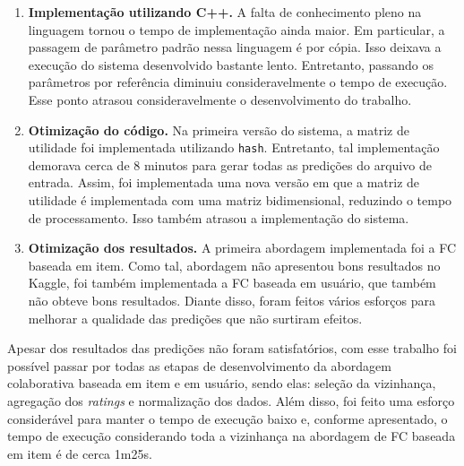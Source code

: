 \documentclass[brazil,a4paper,11pt]{article}
\begin{document}
\begin{enumerate}
 \item \textbf{Implementação utilizando C++.} A falta de conhecimento pleno na linguagem tornou o tempo de implementação ainda maior. Em particular, a passagem de parâmetro padrão nessa linguagem é por cópia. Isso deixava a execução do sistema desenvolvido bastante lento. Entretanto, passando os parâmetros por referência diminuiu consideravelmente o tempo de execução.  Esse ponto atrasou consideravelmente o desenvolvimento do trabalho.
 
 \item \textbf{Otimização do código.} Na primeira versão do sistema, a matriz de utilidade foi implementada utilizando \texttt{hash}. Entretanto, tal implementação demorava cerca de 8 minutos para gerar todas as predições do arquivo de entrada. Assim, foi implementada uma nova versão em que a matriz de utilidade é implementada com uma matriz bidimensional, reduzindo o tempo de processamento. Isso também atrasou a implementação do sistema.
 
 \item \textbf{Otimização dos resultados.} A primeira abordagem implementada foi a FC baseada em item. Como tal, abordagem não apresentou bons resultados no Kaggle, foi também implementada a FC baseada em usuário, que também não obteve bons resultados. Diante disso, foram feitos vários esforços para melhorar a qualidade das predições que não surtiram efeitos. 
\end{enumerate}

Apesar dos resultados das predições não foram satisfatórios, com esse trabalho foi possível passar por todas as etapas de desenvolvimento da abordagem colaborativa baseada em item e em usuário, sendo elas: seleção da vizinhança, agregação dos \textit{ratings} e normalização dos dados. Além disso, foi feito uma esforço considerável para manter o tempo de execução baixo e, conforme apresentado, o tempo de execução considerando toda a vizinhança na abordagem de FC baseada em item é de cerca 1m25s.


%

\end{document}
